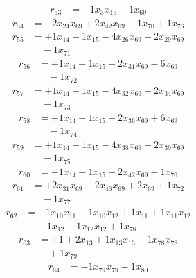\[\begin{aligned}
r_{53} &= - 1 x_{3} x_{15} + 1 x_{69}
\end{aligned}\]
\[\begin{aligned}
r_{54} &= - 2 x_{24} x_{69} + 2 x_{42} x_{69} - 1 x_{70} + 1 x_{76}
\end{aligned}\]
\[\begin{aligned}
r_{55} &= + 1 x_{14} - 1 x_{15} - 4 x_{26} x_{69} - 2 x_{29} x_{69} \\
 &\quad - 1 x_{71}
\end{aligned}\]
\[\begin{aligned}
r_{56} &= + 1 x_{14} - 1 x_{15} - 2 x_{31} x_{69} - 6 x_{69} \\
 &\quad - 1 x_{72}
\end{aligned}\]
\[\begin{aligned}
r_{57} &= + 1 x_{14} - 1 x_{15} - 4 x_{32} x_{69} - 2 x_{34} x_{69} \\
 &\quad - 1 x_{73}
\end{aligned}\]
\[\begin{aligned}
r_{58} &= + 1 x_{14} - 1 x_{15} - 2 x_{36} x_{69} + 6 x_{69} \\
 &\quad - 1 x_{74}
\end{aligned}\]
\[\begin{aligned}
r_{59} &= + 1 x_{14} - 1 x_{15} - 4 x_{38} x_{69} - 2 x_{39} x_{69} \\
 &\quad - 1 x_{75}
\end{aligned}\]
\[\begin{aligned}
r_{60} &= + 1 x_{14} - 1 x_{15} - 2 x_{42} x_{69} - 1 x_{76}
\end{aligned}\]
\[\begin{aligned}
r_{61} &= + 2 x_{31} x_{69} - 2 x_{46} x_{69} + 2 x_{69} + 1 x_{72} \\
 &\quad - 1 x_{77}
\end{aligned}\]
\[\begin{aligned}
r_{62} &= - 1 x_{10} x_{11} + 1 x_{10} x_{12} + 1 x_{11} + 1 x_{11} x_{12} \\
 &\quad - 1 x_{12} - 1 x_{12} x_{12} + 1 x_{78}
\end{aligned}\]
\[\begin{aligned}
r_{63} &= + 1 + 2 x_{13} + 1 x_{13} x_{13} - 1 x_{78} x_{78} \\
 &\quad + 1 x_{79}
\end{aligned}\]
\[\begin{aligned}
r_{64} &= - 1 x_{79} x_{79} + 1 x_{80}
\end{aligned}\]
